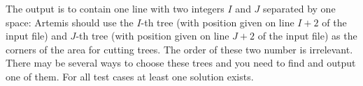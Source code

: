 The output is to contain one line with two integers $I$ and $J$ separated by one space: Artemis should use the $I$-th tree (with position given on line $I+2$ of the input file) and $J$-th tree (with position given on line $J+2$ of the input file) as the corners of the area for cutting trees. The order of these two number is irrelevant. There may be several ways to choose these trees and you need to find and output one of them. For all test cases at least one solution exists.